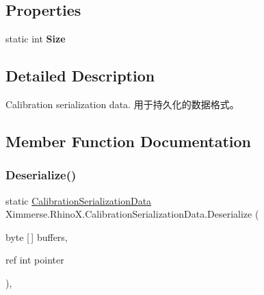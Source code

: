 \subsection*{Properties}
\begin{DoxyCompactItemize}
\item 
\mbox{\label{class_ximmerse_1_1_rhino_x_1_1_calibration_serialization_data_a1485e91da74bc2ad82ba0e3d4aeb6df3}} 
static int {\bfseries Size}
\end{DoxyCompactItemize}


\subsection{Detailed Description}
Calibration serialization data. 用于持久化的数据格式。 



\subsection{Member Function Documentation}
\mbox{\label{class_ximmerse_1_1_rhino_x_1_1_calibration_serialization_data_ab86d9a60c838e8fe8503f0b9126ef86e}} 
\subsubsection{\texorpdfstring{Deserialize()}{Deserialize()}}
{\footnotesize\ttfamily static \mbox{\hyperlink{class_ximmerse_1_1_rhino_x_1_1_calibration_serialization_data}{Calibration\+Serialization\+Data}} Ximmerse.\+Rhino\+X.\+Calibration\+Serialization\+Data.\+Deserialize (\begin{DoxyParamCaption}\item[{byte \mbox{[}$\,$\mbox{]}}]{buffers,  }\item[{ref int}]{pointer }\end{DoxyParamCaption})\hspace{0.3cm}{\ttfamily [inline]}, {\ttfamily [static]}}



